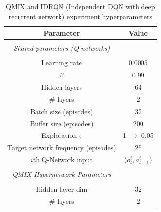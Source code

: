 \documentclass{article}
\begin{document}
\begin{table}[!htb]
    \centering
    \begin{tabular}{c|c}
    \hline
    \textbf{Parameter} & \textbf{Value}\\
    \hline
    & \\
    \textit{Shared parameters (Q-networks)} & \\
    & \\
    Learning rate & 0.0005 \\
    $\beta$ & 0.99\\
    Hidden layers & 64 \\
    \# layers & 2 \\
    Batch size (episodes) & 32\\
    Buffer size (episodes) & 200 \\
    Exploration $\epsilon$ & 1 $\rightarrow$ 0.05 \\
    Target network frequency (episodes) & 25 \\ 
    $i$th Q-Network input& ($o^i_t, a^i_{t-1})$\\
    \hline
    & \\
    \textit{QMIX Hypernetwork Parameters} \\
    & \\
     Hidden layer dim & 32 \\
     \# layers & 2
    \end{tabular}
    \caption{QMIX and IDRQN (Independent DQN with deep recurrent network) experiment hyperparameters}
    \label{tab:parameters-dqn}
\end{table}


\end{document}
